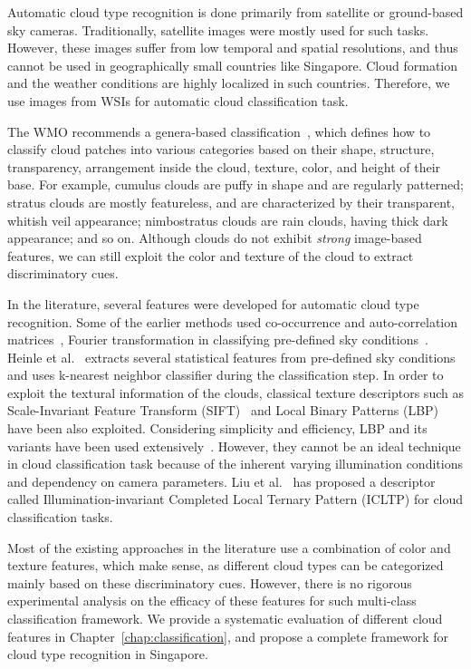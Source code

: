 Automatic cloud type recognition is done primarily from satellite or ground-based sky cameras. Traditionally, satellite images were mostly used for such tasks. However, these images suffer from low temporal and spatial resolutions, and thus cannot be used in geographically small countries like Singapore. Cloud formation and the weather conditions are highly localized in such countries. Therefore, we use images from WSIs for automatic cloud classification task. 

The WMO recommends a genera-based classification~\cite{WMO_guide}, which defines how to classify cloud patches into various categories based on their shape, structure, transparency, arrangement inside the cloud, texture, color, and height of their base. For example, cumulus clouds are puffy in shape and are regularly patterned; stratus clouds are mostly featureless, and are characterized by their transparent, whitish veil appearance; nimbostratus clouds are rain clouds, having thick dark appearance; and so on. Although clouds do not exhibit \emph{strong} image-based features, we can still exploit the color and texture of the cloud to extract discriminatory cues.

In the literature, several features were developed for automatic cloud type recognition. Some of the earlier methods used co-occurrence and auto-correlation matrices~\cite{singh2005}, Fourier transformation in classifying pre-defined sky conditions~\cite{Calbo2008}. Heinle et al.~\cite{Heinle2010} extracts several statistical features from pre-defined sky conditions and uses k-nearest neighbor classifier during the classification step. In order to exploit the textural information of the clouds, classical texture descriptors such as Scale-Invariant Feature Transform (SIFT)~\cite{SIFT} and Local Binary Patterns (LBP)~\cite{cloud_LBP} have been also exploited. Considering simplicity and efficiency, LBP and its variants have been used extensively~\cite{Liu2013,Zhang2016}. However, they cannot be an ideal technique in cloud classification task because of the inherent varying illumination conditions and dependency on camera parameters. Liu et al.\ \cite{Liu2012} has proposed a descriptor called Illumination-invariant Completed Local Ternary Pattern (ICLTP) for cloud classification tasks. 

Most of the existing approaches in the literature use a combination of color and texture features, which make sense, as different cloud types can be categorized mainly based on these discriminatory cues. However, there is no rigorous experimental analysis on the efficacy of these features for such multi-class classification framework. We provide a systematic evaluation of different cloud features in Chapter~\ref{chap:classification}, and propose a complete framework for cloud type recognition in Singapore.



